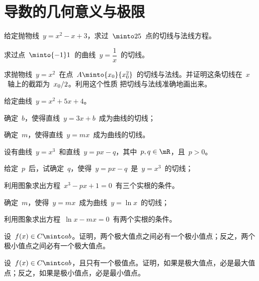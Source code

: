 \section{导数的几何意义与极限}
\begin{exercise}
\item 给定抛物线~$y=x^2-x+3$，求过~$\minto 25$~点的切线与法线方程。
\item 求过点~$\minto {-1}1$~的曲线~$y=\dfrac1x$~的切线。
\item 求抛物线~$y=x^2$~在点~$A\minto{x_0}{x_0^2}$~的切线与法线。并证明这条切线在~$x$~轴上的截距为~$x_0\mathord{/}2$。利用这个性质
把切线与法线准确地画出来。
\item 给定曲线~$y=x^2+5x+4$。
\begin{exlist}
  \item 确定~$b$，使得直线~$y=3x+b$~成为曲线的切线；
  \item 确定~$m$，使得直线~$y=mx$~成为曲线的切线。
\end{exlist}
\item 设有曲线~$y=x^3$~和直线~$y=px-q$，其中~$p,q\in\mR$，且~$p>0$。
\begin{exlist}
  \item 给定~$p$~后，试确定~$q$，使得~$y=px-q$~是~$y=x^3$~的切线；
  \item 利用图象求出方程~$x^3-px+1=0$~有三个实根的条件。
\end{exlist}
\item\begin{exlist}
  \item 确定~$m$，使得~$y=mx$~成为曲线~$y=\ln x$~的切线；
  \item 利用图象求出方程~$\ln x-mx=0$~有两个实根的条件。
\end{exlist}
\item 设~$f(x)\in C\mintc ab$。证明，两个极大值点之间必有一个极小值点；反之，两个极小值点之间必有一个极大值点。
\item 设~$f(x)\in C\mintc ab$，且只有一个极值点。证明，如果是极大值点，必是最大值点；反之，如果是极小值点，必是最小值点。
\end{exercise}

